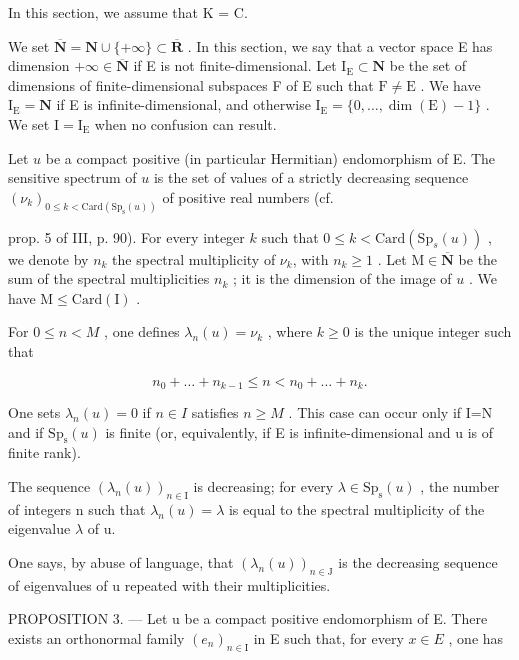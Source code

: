 In this section, we assume that K = C.

We set \(\overline{\mathbf{N}} = \mathbf{N} \cup \{+\infty\} \subset \overline{\mathbf{R}}\) . In this section, we say that a vector space E has dimension \(+\infty \in \overline{\mathbf{N}}\) if E is not finite-dimensional. Let \(\mathrm{I_E} \subset \mathbf{N}\) be the set of dimensions of finite-dimensional subspaces F of E such that \(\mathrm{F} \neq \mathrm{E}\) . We have \(\mathrm{I_E} = \mathbf{N}\) if E is infinite-dimensional, and otherwise \(\mathrm{I_E} = \{0, \ldots, \dim(\mathrm{E}) - 1\}\) . We set \(\mathrm{I} = \mathrm{I_E}\) when no confusion can result.

Let \(u\) be a compact positive (in particular Hermitian) endomorphism of E. The sensitive spectrum of \(u\) is the set of values of a strictly decreasing sequence \((\nu_{k})_{0\leqslant k<\mathrm{Card}(\mathrm{Sp}_{\mathrm{s}}(u))}\) of positive real numbers (cf.

prop. 5 of III, p. 90). For every integer \(k\) such that \(0 \leqslant k < \text{Card}(\text{Sp}_s(u))\) , we denote by \(n_k\) the spectral multiplicity of \(\nu_k\), with \(n_k \geqslant 1\) . Let \(\text{M} \in \overline{\mathbf{N}}\) be the sum of the spectral multiplicities \(n_k\) ; it is the dimension of the image of \(u\) . We have \(\text{M} \leqslant \text{Card}(\text{I})\) .

For \(0 \leqslant n < M\) , one defines \(\lambda_n(u) = \nu_k\) , where \(k \geqslant 0\) is the unique integer such that

\[
n _ {0} + \dots + n _ {k - 1} \leqslant n <   n _ {0} + \dots + n _ {k}.
\]

One sets \(\lambda_{n}(u)=0\) if \(n\in I\) satisfies \(n\geqslant M\) . This case can occur only if I=N and if \(\mathrm{Sp}_{\mathrm{s}}(u)\) is finite (or, equivalently, if E is infinite-dimensional and u is of finite rank).

The sequence \((\lambda_{n}(u))_{n\in\mathrm{I}}\) is decreasing; for every \(\lambda\in\mathrm{Sp}_{\mathrm{s}}(u)\) , the number of integers n such that \(\lambda_{n}(u)=\lambda\) is equal to the spectral multiplicity of the eigenvalue \(\lambda\) of u.

One says, by abuse of language, that \((\lambda_{n}(u))_{n\in\mathrm{J}}\) is the decreasing sequence of eigenvalues of u repeated with their multiplicities.

PROPOSITION 3. --- Let u be a compact positive endomorphism of E. There exists an orthonormal family \((e_{n})_{n\in\mathrm{I}}\) in E such that, for every \(x\in E\) , one has

